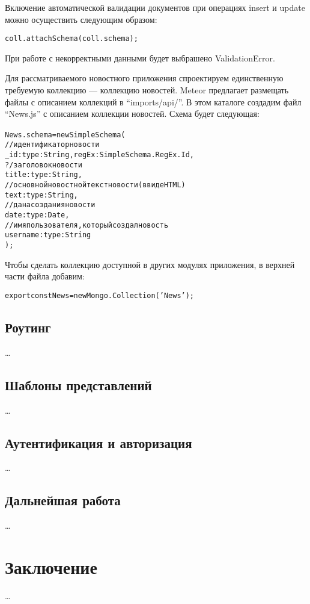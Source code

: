 \documentclass[a4paper,12pt]{article}
\begin{document}
Включение автоматической валидации документов при операциях
insert и update можно осуществить следующим образом:

\begin{alltt}
	coll.attachSchema(coll.schema);
\end{alltt}

При работе с некорректными данными будет выбрашено ValidationError.

Для рассматриваемого новостного приложения спроектируем единственную
требуемую коллекцию --- коллекцию новостей. Meteor предлагает размещать
файлы с описанием коллекций в ``imports/api/''. В этом каталоге
создадим файл ``News.js'' с описанием коллекции новостей.
Схема будет следующая:

\begin{alltt}
News.schema = new SimpleSchema({
	// идентификатор новости
    \_id: { type: String, regEx: SimpleSchema.RegEx.Id },
    ?/ заголовок новости
    title: { type: String },
    // основной новостной текст новости (в виде HTML)
    text: { type: String },
    // дана создания новости
    date: { type: Date },
    // имя пользователя, который создал новость
    username : { type: String }
});
\end{alltt}

Чтобы сделать коллекцию доступной в других модулях
приложения, в верхней части файла добавим:

\begin{alltt}
export const News = new Mongo.Collection('News');
\end{alltt}

\subsection{Роутинг}
\dots



\subsection{Шаблоны представлений}
\dots

\subsection{Аутентификация и авторизация}
\dots

\subsection{Дальнейшая работа}
\dots

\section*{Заключение}
\dots

\begin{thebibliography}{99}
	
\end{thebibliography}
\end{document}
